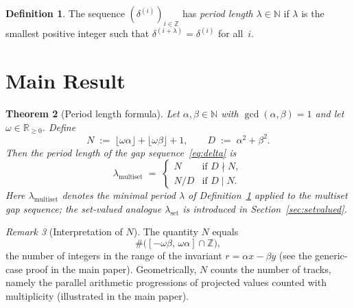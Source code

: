 \documentclass[11pt,reqno]{amsart}
\theoremstyle{plain}
\newtheorem{theorem}{Theorem}[section]
\theoremstyle{definition}
\newtheorem{definition}[theorem]{Definition}
\theoremstyle{remark}
\newtheorem{remark}[theorem]{Remark}
\begin{document}
\begin{definition}\label{def:period}
The sequence \((\delta^{(i)})_{i \in \mathbb{Z}}\) has \emph{period length}
\(\lambda \in \mathbb{N}\) if \(\lambda\) is the smallest positive integer
such that \(\delta^{(i+\lambda)} = \delta^{(i)}\) for all~\(i\).
\end{definition}

\section{Main Result}\label{sec:mainresult}

\begin{theorem}[Period length formula]\label{thm:main}
Let \(\alpha, \beta \in \mathbb{N}\) with \(\gcd(\alpha, \beta) = 1\) and let
\(\omega \in \mathbb{R}_{\ge 0}\).  Define
\begin{equation}\label{eq:ND}
    N \;:=\; \lfloor\omega\alpha\rfloor + \lfloor\omega\beta\rfloor + 1,
    \qquad
    D \;:=\; \alpha^2 + \beta^2.
\end{equation}
Then the period length of the gap sequence~\eqref{eq:delta} is
\begin{equation}\label{eq:formula}
    \lambda_{\mathrm{multiset}} \;=\;
    \begin{cases}
        N   & \text{if } D \nmid N, \\
        N/D & \text{if } D \mid N.
    \end{cases}
\end{equation}
Here \(\lambda_{\mathrm{multiset}}\) denotes the minimal period
\(\lambda\) of Definition~\ref{def:period} applied to the multiset gap
sequence; the set-valued analogue \(\lambda_{\mathrm{set}}\) is introduced
in Section~\ref{sec:setvalued}.
\end{theorem}

\begin{remark}[Interpretation of \(N\)]\label{rem:N}
The quantity \(N\) equals
\[
    \#\bigl([-\omega\beta,\,\omega\alpha]\cap\mathbb{Z}\bigr),
\]
the number of integers in the range of the invariant
\(r = \alpha x - \beta y\) (see the generic-case proof in the main paper).
Geometrically, \(N\) counts the number of tracks, namely the parallel arithmetic progressions of
projected values counted with multiplicity (illustrated in the main paper).
\end{remark}
\end{document}
